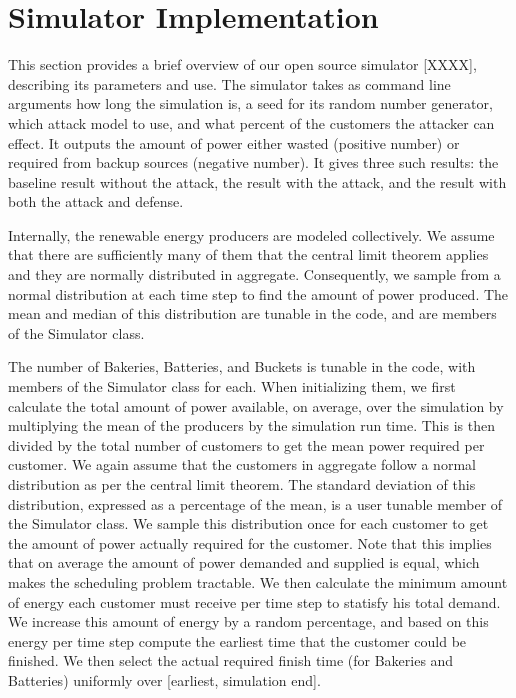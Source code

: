 \documentclass[conference]{IEEEtran}
\begin{document}
\section{Simulator Implementation}
\label{Simulation}

This section provides a brief overview of our open source simulator [XXXX], describing its parameters and use.  The simulator takes as command line arguments how long the simulation is, a seed for its random number generator, which attack model to use, and what percent of the customers the attacker can effect.  It outputs the amount of power either wasted (positive number) or required from backup sources (negative number).  It gives three such results: the baseline result without the attack, the result with the attack, and the result with both the attack and defense.

Internally, the renewable energy producers are modeled collectively.  We assume that there are sufficiently many of them that the central limit theorem applies and they are normally distributed in aggregate.  Consequently, we sample from a normal distribution at each time step to find the amount of power produced.  The mean and median of this distribution are tunable in the code, and are members of the Simulator class.

The number of Bakeries, Batteries, and Buckets is tunable in the code, with members of the Simulator class for each.  When initializing them, we first calculate the total amount of power available, on average, over the simulation by multiplying the mean of the producers by the simulation run time.  This is then divided by the total number of customers to get the mean power required per customer.  We again assume that the customers in aggregate follow a normal distribution as per the central limit theorem.  The standard deviation of this distribution, expressed as a percentage of the mean, is a user tunable member of the Simulator class.  We sample this distribution once for each customer to get the amount of power actually required for the customer.  Note that this implies that on average the amount of power demanded and supplied is equal, which makes the scheduling problem tractable.  We then calculate the minimum amount of energy each customer must receive per time step to statisfy his total demand. We increase this amount of energy by a random percentage, and based on this energy per time step compute the earliest time that the customer could be finished.   We then select the actual required finish time (for Bakeries and Batteries) uniformly over [earliest, simulation end].  
\end{document}
